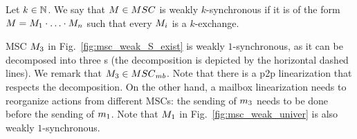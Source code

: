 \documentclass[a4paper,UKenglish,cleveref, autoref, thm-restate]{lipics-v2021}
\begin{document}
\begin{definition}\label{def:weaksync}
Let $k \in \mathbb{N}$.
We say that $\msc \in \MSCs$ is
weakly $k$-synchronous if it is of the form
$M = M_1 \cdot \ldots \cdot M_n$
such that every $M_i$ is a $k$-exchange.
\end{definition}

\noindent \begin{minipage}[c]{10.5cm}
\begin{example}
MSC $M_3$ in Fig.~\ref{fig:msc_weak_S_exist} is weakly $1$-synchronous, as it can be
decomposed  into three s (the decomposition is depicted by the
horizontal dashed lines). We remark that $\msc_3 \in
\mbMSCs$. Note that there is a p2p linearization that respects the decomposition.
On the other hand, a mailbox linearization needs to reorganize actions from different MSCs: the sending of
$m_3$ needs to be done before the sending of $m_1$. Note that $M_1$ in
Fig.~\ref{fig:msc_weak_univer} is also weakly $1$-synchronous.
\end{example}
\end{minipage}
\hfill
\begin{minipage}[c]{3cm}
\begin{center}

\label{fig:msc_weak_S_exist}

\end{center}
\end{minipage}
\end{document}
